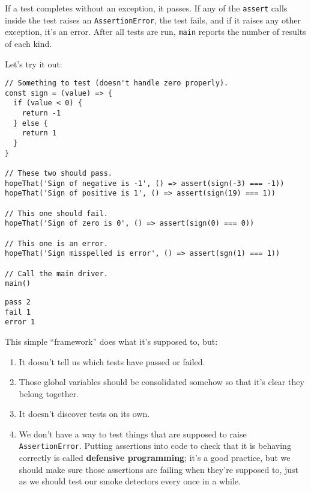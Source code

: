 \documentclass[krantzl]{krantz}
\newcommand{\glossref}[1]{\textbf{#1}}
\begin{document}
\noindent If a test completes without an exception, it passes.
If any of the \texttt{assert} calls inside the test raises an \texttt{AssertionError},
the test fails,
and if it raises any other exception,
it’s an error.
After all tests are run,
\texttt{main} reports the number of results of each kind.


Let’s try it out:


\begin{lstlisting}[frame=tblr]
// Something to test (doesn't handle zero properly).
const sign = (value) => {
  if (value < 0) {
    return -1
  } else {
    return 1
  }
}

// These two should pass.
hopeThat('Sign of negative is -1', () => assert(sign(-3) === -1))
hopeThat('Sign of positive is 1', () => assert(sign(19) === 1))

// This one should fail.
hopeThat('Sign of zero is 0', () => assert(sign(0) === 0))

// This one is an error.
hopeThat('Sign misspelled is error', () => assert(sgn(1) === 1))

// Call the main driver.
main()
\end{lstlisting}



\begin{lstlisting}[frame=tblr,backgroundcolor=\color{black!5}]
pass 2
fail 1
error 1
\end{lstlisting}



This simple “framework” does what it’s supposed to, but:

\begin{enumerate}

\item 

It doesn’t tell us which tests have passed or failed.



\item 

Those global variables should be consolidated somehow
    so that it’s clear they belong together.



\item 

It doesn’t discover tests on its own.



\item 

We don’t have a way to test things that are supposed to raise \texttt{AssertionError}.
    Putting assertions into code to check that it is behaving correctly
    is called \glossref{defensive programming};
    it’s a good practice,
    but we should make sure those assertions are failing when they’re supposed to,
    just as we should test our smoke detectors every once in a while.



\end{enumerate}
\end{document}
